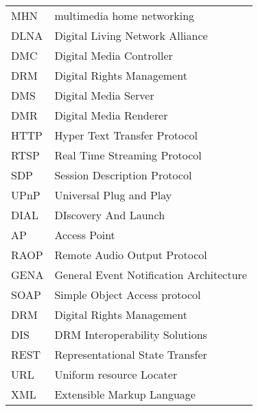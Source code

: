 \begin{tabular}{ll}
MHN	   & multimedia home networking \\
DLNA       & Digital Living Network Alliance\label{dlna_shortfor} \\ 
DMC        & Digital Media Controller \\
DRM        & Digital Rights Management \\ 
DMS        & Digital Media Server \\
DMR        & Digital Media Renderer \\
HTTP       & Hyper Text Transfer Protocol \\
RTSP       & Real Time Streaming Protocol \\
SDP    	& Session Description Protocol\\ 
UPnP	   & Universal Plug and Play \label{upnp_shortfor} \\
DIAL	   & DIscovery And Launch \label{dial_shortfor} \\
AP	   & Access Point \\
RAOP	   & Remote Audio Output Protocol\\
GENA		& General Event Notification Architecture\\
SOAP		& Simple Object Access protocol\\
DRM		& Digital Rights Management\\
DIS		& DRM Interoperability Solutions\\
REST		& Representational State Transfer\\
URL		& Uniform resource Locater \\
XML		& Extensible Markup Language \\
\end{tabular}
